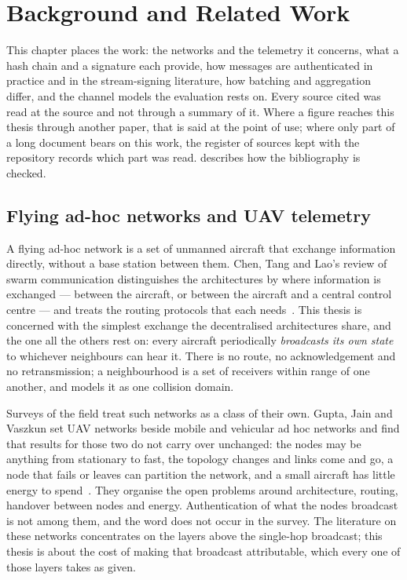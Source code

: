 \chapter{Background and Related Work}\label{ch:background}

This chapter places the work: the networks and the telemetry it concerns, what a hash chain
and a signature each provide, how messages are authenticated in practice and in the
stream-signing literature, how batching and aggregation differ, and the channel models the
evaluation rests on. Every source cited was read at the source and not through a summary of it.
Where a figure reaches this thesis through another paper, that is said at the point of use;
where only part of a long document bears on this work, the register of sources kept with the
repository records which part was read.  describes how the bibliography
is checked.

\section{Flying ad-hoc networks and UAV telemetry}

A flying ad-hoc network is a set of unmanned aircraft that exchange information directly, without
a base station between them. Chen, Tang and Lao's review of swarm communication distinguishes
the architectures by where information is exchanged --- between the aircraft, or between the
aircraft and a central control centre --- and treats the routing protocols that each
needs~\cite{chen2020uavswarm}. This thesis is concerned with the simplest exchange the
decentralised architectures share, and the one all the others rest on: every aircraft
periodically \emph{broadcasts its own state} to whichever neighbours can hear it. There is no
route, no acknowledgement and no retransmission; a neighbourhood is a set of receivers within
range of one another, and  models it as one collision domain.

Surveys of the field treat such networks as a class of their own. Gupta, Jain and Vaszkun set
UAV networks beside mobile and vehicular ad hoc networks and find that results for those two do
not carry over unchanged: the nodes may be anything from stationary to fast, the topology
changes and links come and go, a node that fails or leaves can partition the network, and a
small aircraft has little energy to spend~\cite{gupta2016uavsurvey}. They organise the open
problems around architecture, routing, handover between nodes and energy. Authentication of
what the nodes broadcast is not among them, and the word does not occur in the survey. The
literature on these networks concentrates on the layers above the single-hop broadcast; this
thesis is about the cost of making that broadcast attributable, which every one of those layers
takes as given.

